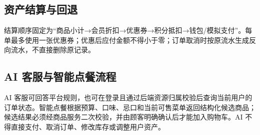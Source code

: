 \subsection{资产结算与回退}


结算顺序固定为“商品小计→会员折扣→优惠券→积分抵扣→钱包/模拟支付”。每单最多使用一张优惠券；优惠后应付金额不得小于零；订单取消时按原流水生成反向流水，不直接删除原记录。

\subsection{AI 客服与智能点餐流程}


AI 客服可回答平台规则，也可在登录且通过后端资源归属校验后查询当前用户的订单状态。智能点餐根据预算、口味、忌口和当前可售菜单返回结构化候选商品；候选结果必须经商品服务二次校验，并由顾客明确确认后才能加入购物车。AI 不得直接支付、取消订单、修改库存或调整用户资产。
